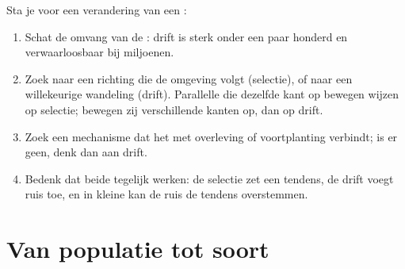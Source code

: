 \begin{method}\label{met:g12:selection-drift-speciation:which}
Sta je voor een verandering van een :
\begin{enumerate}
  \item Schat de omvang van de : drift is sterk onder een paar
        honderd en verwaarloosbaar bij miljoenen.
  \item Zoek naar een richting die de omgeving volgt (selectie), of naar
        een willekeurige wandeling (drift). Parallelle  die
        dezelfde kant op bewegen wijzen op selectie; bewegen zij
        verschillende kanten op, dan op drift.
  \item Zoek een mechanisme dat het  met overleving of voortplanting
        verbindt; is er geen, denk dan aan drift.
  \item Bedenk dat beide tegelijk werken: de selectie zet een tendens,
        de drift voegt ruis toe, en in kleine  kan de ruis de
        tendens overstemmen.
\end{enumerate}
\end{method}

\section{Van populatie tot soort}

